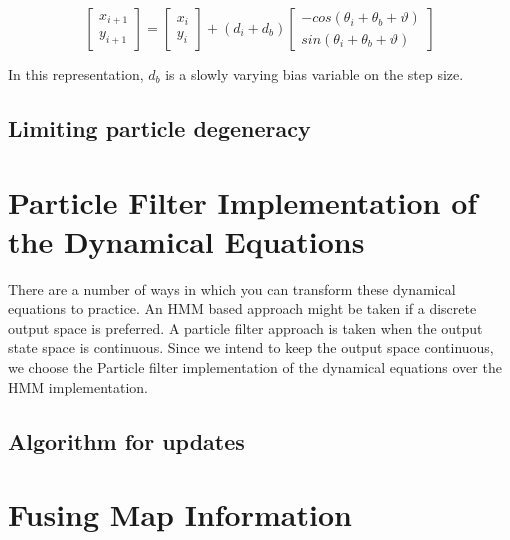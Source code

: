 \begin{equation}
\begin{bmatrix}x_{i+1}\\
y_{i+1}
\end{bmatrix} = \begin{bmatrix}x_{i}\\
y_{i}
\end{bmatrix}  + (d{}_{i}+d_{b}) \begin{bmatrix}-cos(\theta_{i}+\theta_{b}+\vartheta)\\
sin(\theta_{i}+\theta_{b}+\vartheta)
\end{bmatrix} 
\end{equation}

In this representation, $d_{b}$ is a slowly varying bias variable on the step size.

\subsection{Limiting particle degeneracy}


\section{Particle Filter Implementation of the Dynamical Equations}

There are a number of ways in which you can transform these dynamical 
equations to practice. An HMM based approach might be taken if a discrete
output space is preferred. A particle filter approach is taken when the 
output state space is continuous. Since we intend to keep the output space
continuous, we choose the Particle filter implementation of the dynamical
equations over the HMM implementation.

\subsection{Algorithm for updates}


\section{Fusing Map Information}


